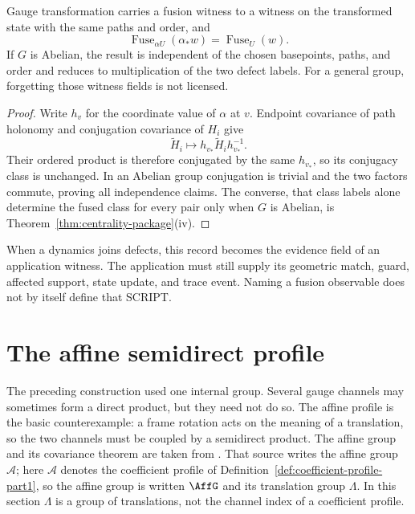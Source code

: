 \begin{proposition}
\label{prop:defect-fusion-covariance}
Gauge transformation carries a fusion witness to a witness on the transformed
state with the same paths and order, and
\[
 \operatorname{Fuse}_{\alpha U}(\alpha_*w)
 =\operatorname{Fuse}_U(w).
\]
If $G$ is Abelian, the result is independent of the chosen basepoints, paths,
and order and reduces to multiplication of the two defect labels.  For a
general group, forgetting those witness fields is not licensed.
\end{proposition}

\begin{proof}
Write $h_v$ for the coordinate value of $\alpha$ at $v$.  Endpoint covariance
of path holonomy and conjugation covariance of $H_i$ give
\[
 \widetilde H_i\longmapsto
 h_{v_*}\widetilde H_i h_{v_*}^{-1}.
\]
Their ordered product is therefore conjugated by the same $h_{v_*}$, so its
conjugacy class is unchanged.  In an Abelian group conjugation is trivial and
the two factors commute, proving all independence claims.  The converse, that
class labels alone determine the fused class for every pair only when $G$ is
Abelian, is Theorem~\ref{thm:centrality-package}\textup{(iv)}.
\end{proof}

When a dynamics joins defects, this record becomes the evidence field
of an application witness.  The application must still supply its geometric
match, guard, affected support, state update, and trace event.  Naming a fusion
observable does not by itself define that SCRIPT.

\section{The affine semidirect profile}
\label{sec:affine-textbook}

The preceding construction used one internal group.  Several gauge channels
may sometimes form a direct product, but they need not do so.  The affine
profile is the basic counterexample: a frame rotation acts on the meaning of
a translation, so the two channels must be coupled by a semidirect product.
The affine group and its covariance theorem are taken from
\cite{PatternGeometry}.  That source writes the affine group $\mathcal A$;
here $\mathcal A$ denotes the coefficient profile of
Definition~\ref{def:coefficient-profile-part1}, so the affine group is
written $\AffG$ and its translation group $\Lambda$.  In this section
$\Lambda$ is a group of translations, not the channel index of a coefficient
profile.


